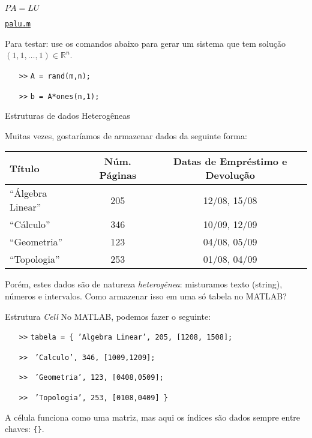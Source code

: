\documentclass[hyperref={pdfpagelabels=false}]{beamer}
\begin{document}
\begin{frame}{$PA=LU$}
   \begin{center}
     \href{listings/palu.m}{\underline{\texttt{palu.m}}}
   \end{center}
   Para testar: use os comandos abaixo para gerar um sistema que tem solução $(1,1,\ldots,1) \in {\mathbb{R}}^n$.
   \begin{itemize}
      \item[\texttt{>>}] \texttt{A = rand(m,n);}
      \item[\texttt{>>}] \texttt{b = A*ones(n,1);}
   \end{itemize}
\end{frame}

\begin{frame}{Estruturas de dados Heterogêneas}

   Muitas vezes, gostaríamos de armazenar dados da seguinte forma:
   \begin{center}
     \footnotesize{%
       \begin{tabular}{l c c}
         Título & Núm. Páginas & Datas de Empréstimo e Devolução\\\toprule
         ``Álgebra Linear'' & 205 & 12/08, 15/08\\
         ``Cálculo'' & 346 & 10/09, 12/09\\
         ``Geometria'' & 123 & 04/08, 05/09\\
         ``Topologia'' & 253 & 01/08, 04/09
       \end{tabular}
       }
   \end{center}

   Porém, estes dados são de natureza \emph{heterogênea}: misturamos texto (string), números e intervalos. Como armazenar isso em uma só tabela no MATLAB?
\end{frame}

\begin{frame}{Estrutura \emph{Cell}}
   No MATLAB, podemos fazer o seguinte:
   \begin{itemize}
      \item[\texttt{>>}] \texttt{tabela = \{ 'Algebra Linear', 205, [1208, 1508];}
      \item[\texttt{>>}] \texttt{\hskip2.2cm 'Calculo', 346, [1009,1209];}
      \item[\texttt{>>}] \texttt{\hskip2.2cm 'Geometria', 123, [0408,0509];}
      \item[\texttt{>>}] \texttt{\hskip2.2cm 'Topologia', 253, [0108,0409] \} }
   \end{itemize}
   A célula funciona como uma matriz, mas aqui os índices são dados sempre entre chaves: \texttt{\{\}}.
\end{frame}
\end{document}
